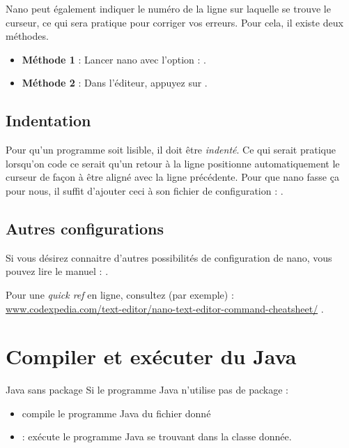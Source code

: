 \documentclass[a4paper,11pt]{style-esi/td}
\begin{document}
		Nano peut également indiquer le numéro de la ligne sur laquelle se trouve le curseur, 
		ce qui sera pratique pour corriger vos erreurs. 
		Pour cela, il existe deux méthodes.

		\begin{itemize} 
		\item \textbf{Méthode 1} : 
			Lancer nano avec l'option  : .
		\item \textbf{Méthode 2} : 
			Dans l'éditeur, appuyez sur .
		\end{itemize}
			
	\subsection{Indentation}
				 
		Pour qu'un programme soit lisible, 
		il doit être \textit{indenté}. 
		Ce qui serait pratique lorsqu'on code ce serait qu'un retour à la ligne 
		positionne automatiquement le curseur de façon à être aligné avec la ligne précédente. 
		Pour que nano fasse ça pour nous, 
		il suffit d'ajouter	ceci à son fichier de configuration : .
			
	\subsection{Autres configurations} 
		
		Si vous désirez connaitre d'autres possibilités de configuration de nano, 
		vous pouvez lire le manuel : .

		Pour une \textit{quick ref} en ligne, consultez (par exemple) : \\
		\url{www.codexpedia.com/text-editor/nano-text-editor-command-cheatsheet/}
		.

\section{Compiler et exécuter du Java}

    \begin{theorie}{Java sans package}
        Si le programme Java n'utilise pas de package :
        \begin{itemize}
            \item {} compile le programme Java du fichier donné
            \item {} : exécute le programme Java se trouvant dans la classe donnée.
        \end{itemize}
    \end{theorie}
\end{document}
